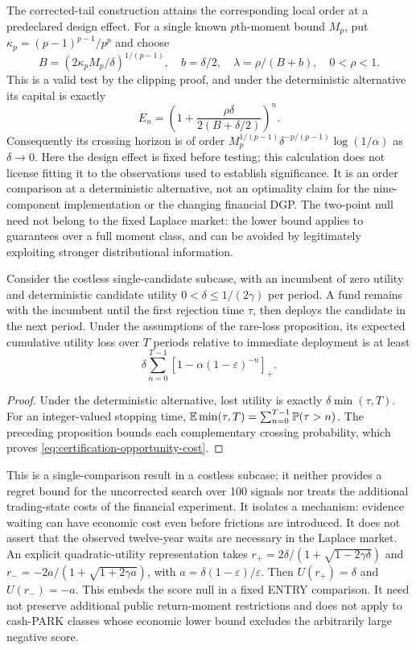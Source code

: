 The corrected-tail construction attains the corresponding local order at
a predeclared design effect. For a single known $p$th-moment bound $M_p$,
put $\kappa_p=(p-1)^{p-1}/p^p$ and choose
\[
 B=(2\kappa_pM_p/\delta)^{1/(p-1)},\quad b=\delta/2,\quad
 \lambda=\rho/(B+b),\quad 0<\rho<1.
\]
This is a valid test by the clipping proof, and under the deterministic
alternative its capital is exactly
\[
 E_n=\left(1+\frac{\rho\delta}{2(B+\delta/2)}\right)^n.
\]
Consequently its crossing horizon is of order
$M_p^{1/(p-1)}\delta^{-p/(p-1)}\log(1/\alpha)$ as $\delta\to0$.
Here the design effect is fixed before testing; this calculation does not
license fitting it to the observations used to establish significance.
It is an order comparison at a deterministic alternative, not an optimality
claim for the nine-component implementation or the changing financial DGP.
The two-point null need not belong to the fixed Laplace market: the lower
bound applies to guarantees over a full moment class, and can be avoided by
legitimately exploiting stronger distributional information.

\begin{corollary}
Consider the costless single-candidate subcase, with an incumbent of zero
utility and deterministic candidate utility $0<\delta\le1/(2\gamma)$ per period. A fund
remains with the incumbent until the first rejection time $\tau$, then
deploys the candidate in the next period. Under the assumptions of the
rare-loss proposition, its expected cumulative utility loss over $T$ periods
relative to immediate deployment is at least
\begin{equation}
 \delta\sum_{n=0}^{T-1}
       \left[1-\alpha(1-\varepsilon)^{-n}\right]_+.
 \label{eq:certification-opportunity-cost}
\end{equation}
\end{corollary}
\begin{proof}
Under the deterministic alternative, lost utility is exactly
$\delta\min(\tau,T)$. For an integer-valued stopping time,
$\mathbb E\min(\tau,T)=\sum_{n=0}^{T-1}\mathbb P(\tau>n)$.
The preceding proposition bounds each complementary crossing probability,
which proves \eqref{eq:certification-opportunity-cost}.
\end{proof}
This is a single-comparison result in a costless subcase; it neither provides
a regret bound for the uncorrected search over 100 signals nor treats the
additional trading-state costs of the financial experiment. It isolates a
mechanism: evidence waiting can have economic cost even before frictions are
introduced. It does not assert that the observed twelve-year waits are
necessary in the Laplace market.
An explicit quadratic-utility representation takes
$r_+=2\delta/(1+\sqrt{1-2\gamma\delta})$ and
$r_-=-2a/(1+\sqrt{1+2\gamma a})$, with
$a=\delta(1-\varepsilon)/\varepsilon$. Then $U(r_+)=\delta$ and $U(r_-)=-a$.
This embeds the score null in a fixed ENTRY comparison. It need not preserve
additional public return-moment restrictions and does not apply to cash-PARK
classes whose economic lower bound excludes the arbitrarily large negative score.

